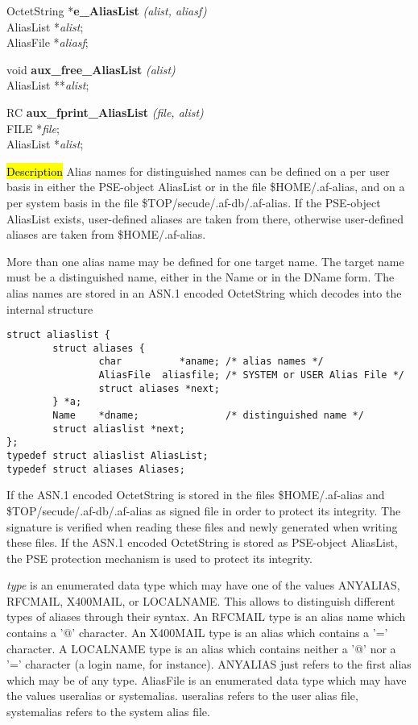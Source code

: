 OctetString *{\bf e\_AliasList} {\em (alist, aliasf)} \\
AliasList *{\em alist}; \\
AliasFile *{\em aliasf};

void {\bf aux\_free\_AliasList} {\em (alist)} \\
AliasList **{\em alist};

RC {\bf aux\_fprint\_AliasList} {\em (file, alist)} \\
FILE *{\em file}; \\
AliasList *{\em alist};

\hl{Description}
Alias names for distinguished names can be defined on a per user basis in either the PSE-object
AliasList or in the file \$HOME/.af-alias, and on a per system basis in the file
\$TOP/secude/.af-db/.af-alias. If the PSE-object AliasList exists, user-defined aliases
are taken from there, otherwise user-defined aliases are taken from \$HOME/.af-alias.

More than one alias name may be defined for one target name. The target name must be a
distinguished name, either in the Name or in the DName form. The alias names are
stored in an ASN.1 encoded OctetString which decodes into the internal structure
\begin{verbatim}
struct aliaslist {
        struct aliases {
                char          *aname; /* alias names */
                AliasFile  aliasfile; /* SYSTEM or USER Alias File */
                struct aliases *next;
        } *a;
        Name    *dname;               /* distinguished name */
        struct aliaslist *next;
};
typedef struct aliaslist AliasList;
typedef struct aliases Aliases;
\end{verbatim}
If the ASN.1 encoded OctetString is stored in the files \$HOME/.af-alias and \$TOP/secude/.af-db/.af-alias as signed file in order to protect its integrity.
The signature is verified when reading these files and newly generated when
writing these files. If the ASN.1 encoded OctetString is stored as PSE-object
AliasList, the PSE protection mechanism is used to protect its integrity.

{\em type} is an enumerated data type which may have one
of the values ANYALIAS, RFCMAIL, X400MAIL, or LOCALNAME. This allows to distinguish
different types of aliases through their syntax. An RFCMAIL type is an alias name which
contains a '@' character. An X400MAIL type is an alias which contains a '=' character.
A LOCALNAME type is an alias which contains neither a '@' nor a '=' character (a login
name, for instance).
ANYALIAS just refers to the first alias which may be of any type.
AliasFile is an enumerated data type which may have the values useralias
or systemalias. useralias refers to the user alias file, systemalias refers
to the system alias file.

